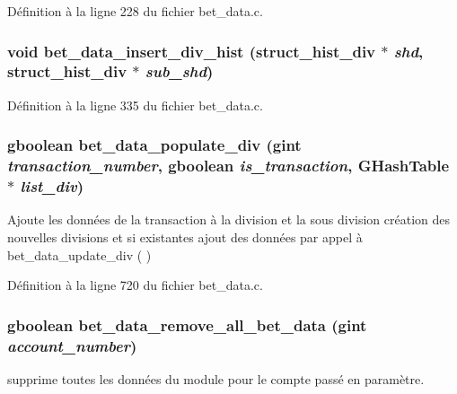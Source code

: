 Définition à la ligne 228 du fichier bet\_\-data.c.

\subsubsection[{bet\_\-data\_\-insert\_\-div\_\-hist}]{\setlength{\rightskip}{0pt plus 5cm}void bet\_\-data\_\-insert\_\-div\_\-hist ({\bf struct\_\-hist\_\-div} $\ast$ {\em shd}, \/  {\bf struct\_\-hist\_\-div} $\ast$ {\em sub\_\-shd})}\label{bet__data_8h_ad0f230cc72b4bb9181f91d2ede65709b}


Définition à la ligne 335 du fichier bet\_\-data.c.

\subsubsection[{bet\_\-data\_\-populate\_\-div}]{\setlength{\rightskip}{0pt plus 5cm}gboolean bet\_\-data\_\-populate\_\-div (gint {\em transaction\_\-number}, \/  gboolean {\em is\_\-transaction}, \/  GHashTable $\ast$ {\em list\_\-div})}\label{bet__data_8h_a0de6607543e7a4e0f2051394707631b5}
Ajoute les données de la transaction à la division et la sous division création des nouvelles divisions et si existantes ajout des données par appel à bet\_\-data\_\-update\_\-div ( ) 

Définition à la ligne 720 du fichier bet\_\-data.c.

\subsubsection[{bet\_\-data\_\-remove\_\-all\_\-bet\_\-data}]{\setlength{\rightskip}{0pt plus 5cm}gboolean bet\_\-data\_\-remove\_\-all\_\-bet\_\-data (gint {\em account\_\-number})}\label{bet__data_8h_a9dbd4a0c3a7673f2972be160d341dd93}
supprime toutes les données du module pour le compte passé en paramètre. 

